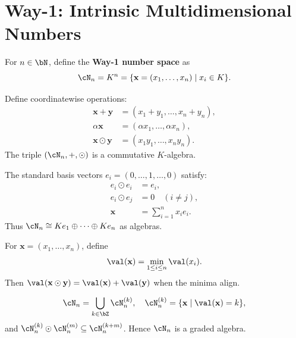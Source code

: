 \section{Way-1: Intrinsic Multidimensional Numbers}

\begin{definition}
For $n \in \bN$, define the \textbf{Way-1 number space} as
\[
\cN_{n} = K^{n} = \{ \mathbf{x} = (x_1,\ldots,x_n) \mid x_i \in K \}.
\]
\end{definition}

\begin{definition}
Define coordinatewise operations:
\begin{align*}
\mathbf{x} + \mathbf{y} &= (x_1 + y_1,\ldots,x_n + y_n), \\
\alpha\mathbf{x} &= (\alpha x_1,\ldots,\alpha x_n), \\
\mathbf{x} \odot \mathbf{y} &= (x_1y_1,\ldots,x_ny_n).
\end{align*}
The triple $(\cN_n, +, \odot)$ is a commutative $K$-algebra.
\end{definition}

\begin{theorem}
The standard basis vectors $e_i = (0,\ldots,1,\ldots,0)$ satisfy:
\begin{align*}
e_i \odot e_i &= e_i, \\
e_i \odot e_j &= 0 \quad (i \neq j), \\
\mathbf{x} &= \sum_{i=1}^{n} x_i e_i.
\end{align*}
Thus $\cN_n \cong Ke_1 \oplus \cdots \oplus Ke_n$ as algebras.
\end{theorem}

\begin{definition}
For $\mathbf{x} = (x_1,\ldots,x_n)$, define
\[
\val(\mathbf{x}) = \min_{1\leq i\leq n} \val(x_i).
\]
Then $\val(\mathbf{x} \odot \mathbf{y}) = \val(\mathbf{x}) + \val(\mathbf{y})$ when the minima align.
\end{definition}

\begin{theorem}
\[
\cN_n = \bigcup_{k\in\bZ} \cN_n^{(k)}, \quad \cN_n^{(k)} = \{ \mathbf{x} \mid \val(\mathbf{x}) = k \},
\]
and $\cN_n^{(k)} \odot \cN_n^{(m)} \subseteq \cN_n^{(k+m)}$. Hence $\cN_n$ is a graded algebra.
\end{theorem}

